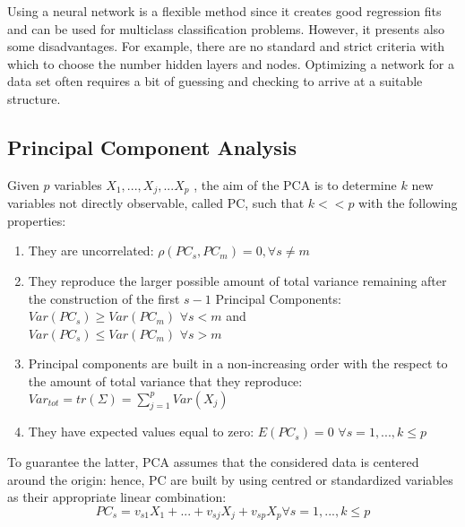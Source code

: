 \documentclass{emulateapj}
\begin{document}
Using a neural network is a flexible method since it creates good regression fits and can be used for multiclass classification problems. However, it presents also some disadvantages. For example, there are no standard and strict criteria with which to choose the number hidden layers and nodes. Optimizing a network for a data set often requires a bit of guessing and checking to arrive at a suitable structure.





\subsection{Principal Component Analysis} \label{PCA}

Given $p$ variables $X_1,...,X_j,...X_p$  , the aim of the PCA is to determine $k$ new variables not directly observable, called PC, such that $k<<p$ with the following properties:
\begin{enumerate}
 \item They are uncorrelated: $\rho(PC_s,PC_m)=0, \forall s \neq m $
 \item They reproduce the larger possible amount of total variance remaining after the construction of the first $s-1$ Principal Components:\\
 $Var(PC_s)\geq Var(PC_m)$  $\forall s < m $ and \\$Var(PC_s)\leq Var(PC_m)$  $\forall s >m$
 \item Principal components are built in a non-increasing order with the respect to the amount of total variance that they reproduce:\\
 $Var_{tot}=tr(\Sigma)=\sum_{j=1}^{p}Var(X_j)$
 \item They have expected values equal to zero:
 $E(PC_s)=0$  $\forall s=1,...,k \leq p$
 \end{enumerate}
To guarantee the latter, PCA assumes that the considered data is centered around the origin: hence, PC are built by using centred or standardized variables as their appropriate linear combination:
\begin{equation}
    PC_s=v_{s1}X_1+...+v_{sj}X_j+v_{sp}X_p \forall s=1,...,k\leq p
\end{equation}
\end{document}
